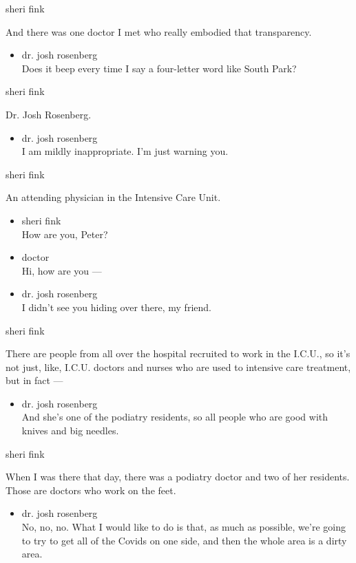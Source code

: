 sheri fink

And there was one doctor I met who really embodied that transparency.

\begin{itemize}
\tightlist
\item
  dr. josh rosenberg\\
  Does it beep every time I say a four-letter word like South Park?
\end{itemize}

sheri fink

Dr. Josh Rosenberg.

\begin{itemize}
\tightlist
\item
  dr. josh rosenberg\\
  I am mildly inappropriate. I'm just warning you.
\end{itemize}

sheri fink

An attending physician in the Intensive Care Unit.

\begin{itemize}
\item
  sheri fink\\
  How are you, Peter?
\item
  doctor\\
  Hi, how are you ---
\item
  dr. josh rosenberg\\
  I didn't see you hiding over there, my friend.
\end{itemize}

sheri fink

There are people from all over the hospital recruited to work in the
I.C.U., so it's not just, like, I.C.U. doctors and nurses who are used
to intensive care treatment, but in fact ---

\begin{itemize}
\tightlist
\item
  dr. josh rosenberg\\
  And she's one of the podiatry residents, so all people who are good
  with knives and big needles.
\end{itemize}

sheri fink

When I was there that day, there was a podiatry doctor and two of her
residents. Those are doctors who work on the feet.

\begin{itemize}
\tightlist
\item
  dr. josh rosenberg\\
  No, no, no. What I would like to do is that, as much as possible,
  we're going to try to get all of the Covids on one side, and then the
  whole area is a dirty area.
\end{itemize}

